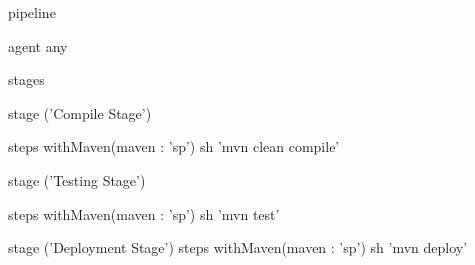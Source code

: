 pipeline {
    agent any

    stages {
        stage ('Compile Stage') {

            steps {
                withMaven(maven : 'sp') {
                    sh 'mvn clean compile'
                }
            }
        }

        stage ('Testing Stage') {

            steps {
                withMaven(maven : 'sp') {
                    sh 'mvn test'
                }
            }
        }


        stage ('Deployment Stage') {
            steps {
                withMaven(maven : 'sp') {
                    sh 'mvn deploy'
                }
            }
        }
    }
}  

